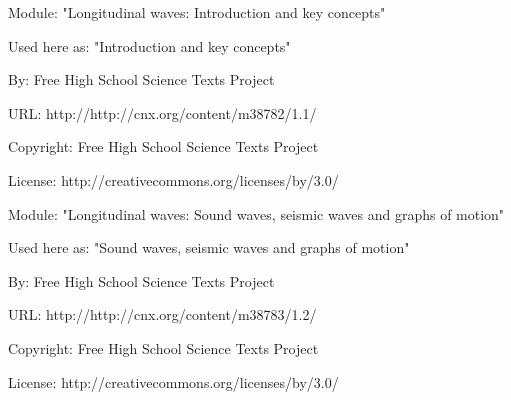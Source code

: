       \par\vspace{9pt}\noindent\begin{minipage}{\textwidth}
      Module: "Longitudinal waves: Introduction and key concepts" \par\nopagebreak\noindent
      Used here as: "Introduction and key concepts" \par\nopagebreak\noindent
        By: Free High School Science Texts Project\par\nopagebreak\noindent
      URL: http://http://cnx.org/content/m38782/1.1/\par\nopagebreak\noindent
      \par\nopagebreak\noindent
      Copyright: Free High School Science Texts Project\par\nopagebreak\noindent
      License:  http://creativecommons.org/licenses/by/3.0/\par\nopagebreak\noindent
      \par\end{minipage}
      \par\vspace{9pt}\noindent\begin{minipage}{\textwidth}
      Module: "Longitudinal waves: Sound waves, seismic waves and graphs of motion" \par\nopagebreak\noindent
      Used here as: "Sound waves, seismic waves and graphs of motion" \par\nopagebreak\noindent
        By: Free High School Science Texts Project\par\nopagebreak\noindent
      URL: http://http://cnx.org/content/m38783/1.2/\par\nopagebreak\noindent
      \par\nopagebreak\noindent
      Copyright: Free High School Science Texts Project\par\nopagebreak\noindent
      License:  http://creativecommons.org/licenses/by/3.0/\par\nopagebreak\noindent
      \par\end{minipage}
